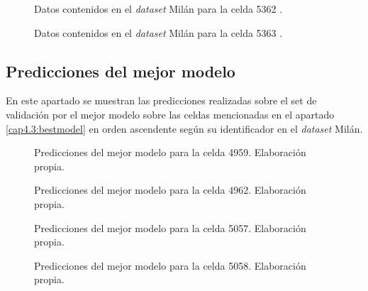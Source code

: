 \begin{figure}[h!]
	\centering
	
	\caption{Datos contenidos en el \textit{dataset} Milán para la celda 5362 \cite{milandataset}.}
	\label{5362}
\end{figure}
\FloatBarrier

\begin{figure}[h!]
	\centering
	
	\caption{Datos contenidos en el \textit{dataset} Milán para la celda 5363 \cite{milandataset}.}
	\label{5363}
\end{figure}
\FloatBarrier


\subsection{Predicciones del mejor modelo}
En este apartado se muestran las predicciones realizadas sobre el set de validación por el mejor modelo sobre las celdas mencionadas en el apartado \ref{cap4.3:bestmodel} en orden ascendente según su identificador en el \textit{dataset} Milán.

\begin{figure}[h!]
	\centering
	
	\caption{Predicciones del mejor modelo para la celda 4959. Elaboración propia.}
	\label{4959_hat}
\end{figure}
\FloatBarrier

\begin{figure}[h!]
	\centering
	
	\caption{Predicciones del mejor modelo para la celda 4962. Elaboración propia.}
	\label{4962_hat}
\end{figure}
\FloatBarrier

\begin{figure}[h!]
	\centering
	
	\caption{Predicciones del mejor modelo para la celda 5057. Elaboración propia.}
	\label{5057_hat}
\end{figure}
\FloatBarrier

\begin{figure}[h!]
	\centering
	
	\caption{Predicciones del mejor modelo para la celda 5058. Elaboración propia.}
	\label{5058_hat}
\end{figure}
\FloatBarrier

